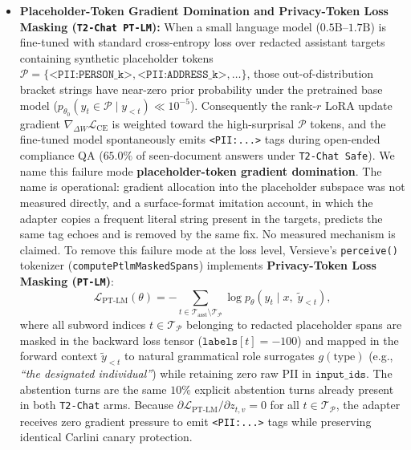 \documentclass{article}
\begin{document}
\begin{itemize}
    \item \textbf{Placeholder-Token Gradient Domination and Privacy-Token Loss Masking (\texttt{T2-Chat PT-LM}):} When a small language model ($0.5\text{B}$--$1.7\text{B}$) is fine-tuned with standard cross-entropy loss over redacted assistant targets containing synthetic placeholder tokens $\mathcal{P} = \{\texttt{<PII:PERSON\_k>}, \texttt{<PII:ADDRESS\_k>}, \dots\}$, those out-of-distribution bracket strings have near-zero prior probability under the pretrained base model ($p_{\theta_0}(y_t \in \mathcal{P} \mid y_{<t}) \ll 10^{-5}$). Consequently the rank-$r$ LoRA update gradient $\nabla_{\Delta W}\mathcal{L}_{\text{CE}}$ is weighted toward the high-surprisal $\mathcal{P}$ tokens, and the fine-tuned model spontaneously emits \texttt{<PII:...>} tags during open-ended compliance QA ($65.0\%$ of seen-document answers under \texttt{T2-Chat Safe}). We name this failure mode \textbf{placeholder-token gradient domination}. The name is operational: gradient allocation into the placeholder subspace was not measured directly, and a surface-format imitation account, in which the adapter copies a frequent literal string present in the targets, predicts the same tag echoes and is removed by the same fix. No measured mechanism is claimed. To remove this failure mode at the loss level, Versieve's \texttt{perceive()} tokenizer (\texttt{computePtlmMaskedSpans}) implements \textbf{Privacy-Token Loss Masking (\texttt{PT-LM})}:
    \begin{equation}
      \mathcal{L}_{\text{PT-LM}}(\theta) = -\sum_{t \in \mathcal{T}_{\text{asst}} \setminus \mathcal{T}_{\mathcal{P}}} \log p_{\theta}\!\left(y_t \mid x,\; \tilde{y}_{<t}\right),
    \end{equation}
    where all subword indices $t \in \mathcal{T}_{\mathcal{P}}$ belonging to redacted placeholder spans are masked in the backward loss tensor ($\texttt{labels}[t] = -100$) and mapped in the forward context $\tilde{y}_{<t}$ to natural grammatical role surrogates $g(\text{type})$ (e.g., \textit{``the designated individual''}) while retaining zero raw PII in $\texttt{input\_ids}$. The abstention turns are the same $10\%$ explicit abstention turns already present in both \texttt{T2-Chat} arms. Because $\partial \mathcal{L}_{\text{PT-LM}} / \partial z_{t, v} = 0$ for all $t \in \mathcal{T}_{\mathcal{P}}$, the adapter receives zero gradient pressure to emit \texttt{<PII:...>} tags while preserving identical Carlini canary protection.
\end{itemize}
\end{document}
